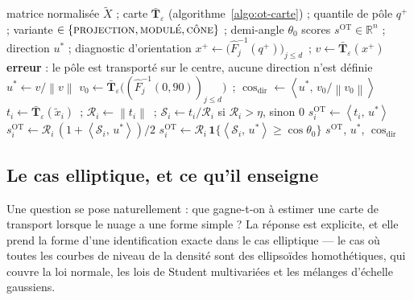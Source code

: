 \documentclass[11pt,a4paper]{article}
\theoremstyle{definition}
\theoremstyle{remark}
\newcommand{\R}{\mathbb{R}}
\newcommand{\norm}[1]{\left\lVert #1 \right\rVert}
\newcommand{\scal}[2]{\left\langle #1 ,\, #2 \right\rangle}
\newcommand{\ind}[1]{\mathbf{1}\{#1\}}
\newcommand{\Tmap}{\mathbf{T}}
\begin{document}
\bigskip

\begin{algorithm}[htbp]
  \caption{Score de Kantorovitch orienté}
  \label{algo:ot-score}
  \begin{algorithmic}[1]
    \Require matrice normalisée $\tilde{X}$ ; carte $\bar{\Tmap}_\varepsilon$
      (algorithme~\ref{algo:ot-carte}) ; quantile de pôle $q^{+}$ ; variante
      $\in \{\textsc{projection}, \textsc{modulé}, \textsc{cône}\}$ ; demi-angle $\theta_0$
    \Ensure scores $s^{\mathrm{OT}} \in \R^n$ ; direction $u^{*}$ ; diagnostic
      d'orientation
    \State $x^{+} \gets \big(\hat{F}_j^{-1}(q^{+})\big)_{j \le d}$~;\quad
      $v \gets \bar{\Tmap}_\varepsilon(x^{+})$
    \If{$\norm{v} \le \eta$}
      \State \textbf{erreur} : le pôle est transporté sur le centre, aucune direction
        n'est définie
    \EndIf
    \State $u^{*} \gets v/\norm{v}$
    \State $v_{0} \gets \bar{\Tmap}_\varepsilon\big((\hat{F}_j^{-1}(0{,}90))_{j \le d}\big)$~;\quad
      $\cos_{\mathrm{dir}} \gets \scal{u^{*}}{v_{0}/\norm{v_{0}}}$
      \State $t_i \gets \bar{\Tmap}_\varepsilon(\tilde{x}_i)$~;\quad
        $\mathcal{R}_i \gets \norm{t_i}$~;\quad
        $\mathcal{S}_i \gets t_i/\mathcal{R}_i$ si $\mathcal{R}_i > \eta$, sinon $0$
        \State $s^{\mathrm{OT}}_i \gets \scal{t_i}{u^{*}}$
        \State $s^{\mathrm{OT}}_i \gets
          \mathcal{R}_i\,(1 + \scal{\mathcal{S}_i}{u^{*}})/2$
      \Else
        \State $s^{\mathrm{OT}}_i \gets
          \mathcal{R}_i\,\ind{\scal{\mathcal{S}_i}{u^{*}} \ge \cos\theta_0}$
      \EndIf
    \EndFor
    \State \Return $s^{\mathrm{OT}}$, $u^{*}$, $\cos_{\mathrm{dir}}$
  \end{algorithmic}
\end{algorithm}

\bigskip

\subsection{Le cas elliptique, et ce qu'il enseigne}
\label{sec:ot-elliptique}

\medskip

Une question se pose naturellement : que gagne-t-on à estimer une carte de transport
lorsque le nuage a une forme simple ? La réponse est explicite, et elle prend la forme
d'une identification exacte dans le cas elliptique --- le cas où toutes les courbes de
niveau de la densité sont des ellipsoïdes homothétiques, qui couvre la loi normale, les
lois de Student multivariées et les mélanges d'échelle gaussiens.
\end{document}

